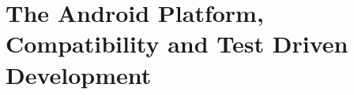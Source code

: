 
\section{The Android Platform, Compatibility and Test Driven Development}
\label{sec:the_android_platform_compatibility_and_test_driven_development}


 


